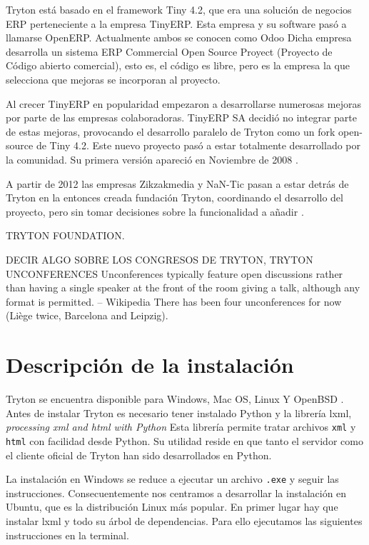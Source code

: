 \documentclass{article}
\begin{document}
Tryton está basado en el framework Tiny 4.2, que era una solución de negocios ERP perteneciente a la empresa TinyERP. Esta empresa y su software pasó a llamarse OpenERP. Actualmente ambos se conocen como Odoo Dicha empresa desarrolla un sistema ERP Commercial Open Source Proyect (Proyecto de Código abierto comercial), esto es, el código es libre, pero es la empresa la que selecciona que mejoras se incorporan al proyecto.

Al crecer TinyERP en popularidad empezaron a desarrollarse numerosas mejoras por parte de las empresas colaboradoras. TinyERP SA decidió no integrar parte de estas mejoras, provocando el desarrollo paralelo de Tryton como un fork open-source de Tiny 4.2. Este nuevo proyecto pasó a estar totalmente desarrollado por la comunidad. Su primera versión apareció en Noviembre de 2008 \cite{que-es-tryton}.

A partir de 2012 las empresas Zikzakmedia y NaN-Tic pasan a estar detrás de Tryton en la entonces creada fundación Tryton, coordinando el desarrollo del proyecto, pero sin tomar decisiones sobre la funcionalidad a añadir \cite{zikzak}.

TRYTON FOUNDATION.

DECIR ALGO SOBRE LOS CONGRESOS DE TRYTON, TRYTON UNCONFERENCES
Unconferences typically feature open discussions rather than having a single
speaker at the front of the room giving a talk, although any format is permitted.
– Wikipedia
There has been four unconferences for now (Liège twice, Barcelona and
Leipzig).


\section{Descripción de la instalación}

Tryton se encuentra disponible para Windows, Mac OS, Linux Y OpenBSD \cite{descarga}. Antes de instalar Tryton es necesario tener instalado Python y la librería lxml, \emph{processing xml and html with Python} \cite{lxml} Esta librería permite tratar archivos \texttt{xml} y \texttt{html} con facilidad desde Python. Su utilidad reside en que tanto el servidor como el cliente oficial de Tryton han sido desarrollados en Python.

La instalación en Windows se reduce a ejecutar un archivo \texttt{.exe} y seguir las instrucciones. Consecuentemente nos centramos a desarrollar la instalación en Ubuntu, que es la distribución Linux más popular. En primer lugar hay que instalar lxml y todo su árbol de dependencias. Para ello ejecutamos las siguientes instrucciones en la terminal.
\end{document}
